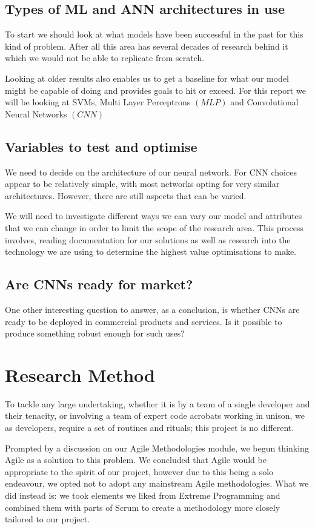 \subsection{Types of ML and ANN architectures in use}
To start we should look at what models have been successful in the past for this kind of problem. After all this area has several decades of research behind it which we would not be able to replicate from scratch.

Looking at older results also enables us to get a baseline for what our model might be capable of doing and provides goals to hit or exceed. For this report we will be looking at SVMs, Multi Layer Perceptrons $\left(MLP\right)$ and Convolutional Neural Networks $\left(CNN\right)$

\subsection{Variables to test and optimise}
We need to decide on the architecture of our neural network. For CNN choices appear to be relatively simple, with most networks opting for very similar architectures. However, there are still aspects that can be varied.

We will need to investigate different ways we can vary our model and attributes that we can change in order to limit the scope of the research area. This process involves, reading documentation for our solutions as well as research into the technology we are using to determine the highest value optimisations to make.

\subsection{Are CNNs ready for market?}
One other interesting question to answer, as a conclusion, is whether CNNs are ready to be deployed in commercial products and services. Is it possible to produce something robust enough for such uses?

\section{Research Method}
To tackle any large undertaking, whether it is by a team of a single developer and their tenacity, or involving a team of expert code acrobats working in unison, we as developers, require a set of routines and rituals; this project is no different.

Prompted by a discussion on our Agile Methodologies module, we begun thinking Agile as a solution to this problem. We concluded that Agile would be appropriate to the spirit of our project, however due to this being a solo endeavour, we opted not to adopt any mainstream Agile methodologies. What we did instead is: we took elements we liked from Extreme Programming and combined them with parts of Scrum to create a methodology more closely tailored to our project.


